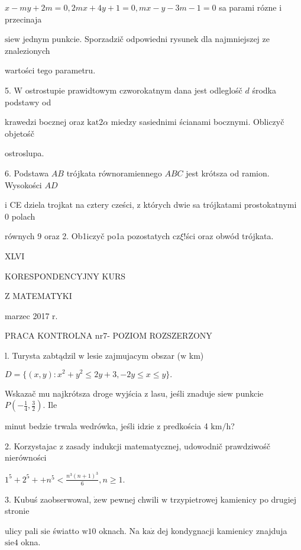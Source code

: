 \documentclass[a4paper,12pt]{article}
\begin{document}
$x-my+2m=0, 2mx+4y+1=0, mx-y-3m-1=0$ sa parami rózne $\mathrm{i}$ przecinaja

$\mathrm{s}\mathrm{i}\mathrm{e}\mathrm{w}$ jednym punkcie. Sporzadzič odpowiedni rysunek dla najmniejszej ze znalezionych

wartości tego parametru.

5. $\mathrm{W}$ ostrostupie prawidtowym czworokatnym dana jest odleglośč $d$ środka podstawy od

krawedzi bocznej oraz $\mathrm{k}\mathrm{a}\mathrm{t}2\alpha$ miedzy sasiednimi ścianami bocznymi. Obliczyč objetośč

ostroslupa.

6. Podstawa $AB$ trójkata równoramiennego $ABC$ jest krótsza od ramion. Wysokości $AD$

$\mathrm{i}$ CE dziela trojkat na cztery cześci, $\mathrm{z}$ których dwie sa trójkatami prostokatnymi $0$ polach

równych 9 oraz 2. Ob1iczyč po1a pozostatych cz$\xi$!ści oraz obwód trójkata.




XLVI

KORESPONDENCYJNY KURS

Z MATEMATYKI

marzec 2017 r.

PRACA KONTROLNA $\mathrm{n}\mathrm{r} 7$- POZIOM ROZSZERZONY

l. Turysta zabtądzil $\mathrm{w}$ lesie zajmujacym obszar ($\mathrm{w}$ km)

$D=\{(x,y):x^{2}+y^{2}\leq 2y+3,-2y\leq x\leq y\}.$

Wskazač mu najkrótsza droge wyjścia $\mathrm{z}$ lasu, jeśli znaduje $\mathrm{s}\mathrm{i}\mathrm{e}\mathrm{w}$ punkcie $P(-\displaystyle \frac{1}{4},\frac{3}{2})$. Ile

minut bedzie trwala wedrówka, jeśli idzie $\mathrm{z}$ predkościa 4 $\mathrm{k}\mathrm{m}/\mathrm{h}$?

2. Korzystajac $\mathrm{z}$ zasady indukcji matematycznej, udowodnič prawdziwośč nierówności

$1^{5}+2^{5}++n^{5}<\displaystyle \frac{n^{3}(n+1)^{3}}{6},n\geq 1.$

3. Kubuś zaobserwowal, $\dot{\mathrm{z}}\mathrm{e}\mathrm{w}$ pewnej chwili $\mathrm{w}$ trzypietrowej kamienicy po drugiej stronie

ulicy pali $\mathrm{s}\mathrm{i}\mathrm{e}$ światto $\mathrm{w}10$ oknach. Na $\mathrm{k}\mathrm{a}\dot{\mathrm{z}}$ dej kondygnacji kamienicy znajduja $\mathrm{s}\mathrm{i}\mathrm{e}4$ okna.
\end{document}
